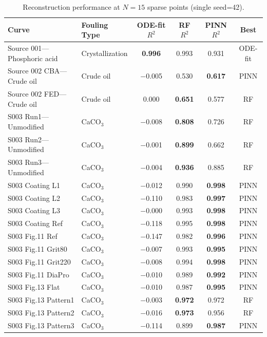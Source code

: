 \documentclass[review]{elsarticle}
\begin{document}
\begin{table}[htbp]
\centering
\caption{Reconstruction performance at $N=15$ sparse points (single seed=42).}
\label{tab:main_results}
\footnotesize
\begin{tabular}{@{}p{2.8cm}p{2.4cm}cccc@{}}
\toprule
Curve & Fouling Type & ODE-fit $R^2$ & RF $R^2$ & PINN $R^2$ & Best \\
\midrule
Source 001---Phosphoric acid & Crystallization & \textbf{0.996} & 0.993 & 0.931 & ODE-fit \\
Source 002 CBA---Crude oil & Crude oil & $-$0.005 & 0.530 & \textbf{0.617} & PINN \\
Source 002 FED---Crude oil & Crude oil & 0.000 & \textbf{0.651} & 0.577 & RF \\
S003 Run1---Unmodified & CaCO$_3$ & $-$0.008 & \textbf{0.808} & 0.726 & RF \\
S003 Run2---Unmodified & CaCO$_3$ & $-$0.001 & \textbf{0.899} & 0.662 & RF \\
S003 Run3---Unmodified & CaCO$_3$ & $-$0.004 & \textbf{0.936} & 0.885 & RF \\
S003 Coating L1 & CaCO$_3$ & $-$0.012 & 0.990 & \textbf{0.998} & PINN \\
S003 Coating L2 & CaCO$_3$ & $-$0.110 & 0.983 & \textbf{0.997} & PINN \\
S003 Coating L3 & CaCO$_3$ & $-$0.000 & 0.993 & \textbf{0.998} & PINN \\
S003 Coating Ref & CaCO$_3$ & $-$0.118 & 0.995 & \textbf{0.998} & PINN \\
S003 Fig.11 Ref & CaCO$_3$ & $-$0.147 & 0.982 & \textbf{0.996} & PINN \\
S003 Fig.11 Grit80 & CaCO$_3$ & $-$0.007 & 0.993 & \textbf{0.995} & PINN \\
S003 Fig.11 Grit220 & CaCO$_3$ & $-$0.008 & 0.994 & \textbf{0.998} & PINN \\
S003 Fig.11 DiaPro & CaCO$_3$ & $-$0.010 & 0.989 & \textbf{0.992} & PINN \\
S003 Fig.13 Flat & CaCO$_3$ & $-$0.010 & 0.987 & \textbf{0.995} & PINN \\
S003 Fig.13 Pattern1 & CaCO$_3$ & $-$0.003 & \textbf{0.972} & 0.972 & RF \\
S003 Fig.13 Pattern2 & CaCO$_3$ & $-$0.016 & \textbf{0.973} & 0.956 & RF \\
S003 Fig.13 Pattern3 & CaCO$_3$ & $-$0.114 & 0.899 & \textbf{0.987} & PINN \\
\bottomrule
\end{tabular}
\end{table}
\end{document}
